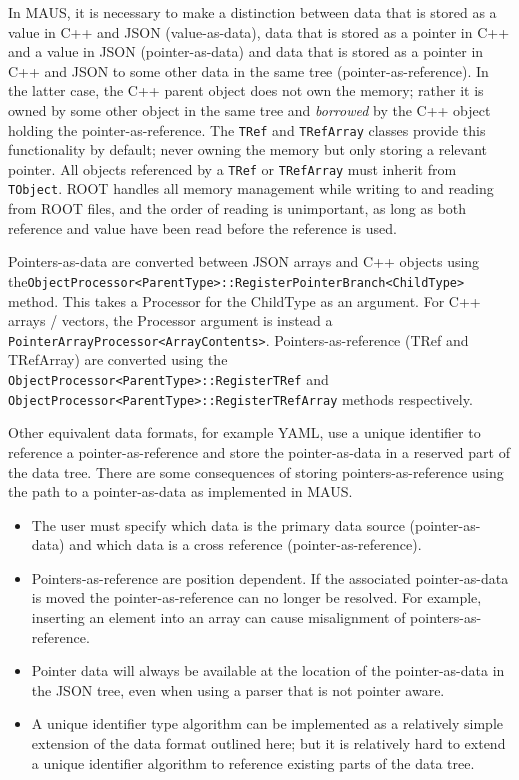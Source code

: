 In MAUS, it is necessary to make a distinction between data that is stored as a value in C++ and JSON (value-as-data), 
data that is stored as a pointer in C++ and a value in JSON (pointer-as-data) 
and data that is stored as a pointer in C++ and JSON to some other data in the same tree (pointer-as-reference). 
In the latter case, the C++ parent object does not own the memory; 
rather it is owned by some other object in the same tree and 
\emph{borrowed} by the C++ object holding the pointer-as-reference.
The \verb|TRef| and \verb|TRefArray| classes provide this functionality by default;
never owning the memory but only storing a relevant pointer.
All objects referenced by a \verb|TRef| or \verb|TRefArray|
must inherit from \verb|TObject|.
ROOT handles all memory management while writing to and reading from ROOT files,
and the order of reading is unimportant,
as long as both reference and value have been read before the reference is used.

Pointers-as-data are converted between JSON arrays and C++ objects
using the\linebreak\verb|ObjectProcessor<ParentType>::RegisterPointerBranch<ChildType>| method.
This takes a Processor for the ChildType as an argument.
For C++ arrays / vectors, the Processor argument is instead a 
\verb|PointerArrayProcessor<ArrayContents>|.
Pointers-as-reference (TRef and TRefArray) are converted using the
\verb|ObjectProcessor<ParentType>::RegisterTRef| and\linebreak
\verb|ObjectProcessor<ParentType>::RegisterTRefArray| methods respectively.

Other equivalent data formats, for example YAML, use a unique identifier to reference a pointer-as-reference and store the pointer-as-data in a reserved part of the data tree. There are some consequences of storing pointers-as-reference using the path to a pointer-as-data as implemented in MAUS.
\begin{itemize}
\item The user must specify which data is the primary data source (pointer-as-data) and which data is a cross reference (pointer-as-reference).
\item Pointers-as-reference are position dependent. If the associated pointer-as-data is moved the pointer-as-reference can no longer be resolved. For example, inserting an element into an array can cause misalignment of pointers-as-reference.
\item Pointer data will always be available at the location of the pointer-as-data in the JSON tree, even when using a parser that is not pointer aware.
\item A unique identifier type algorithm can be implemented as a relatively simple extension of the data format outlined here; but it is relatively hard to extend a unique identifier algorithm to reference existing parts of the data tree.
\end{itemize}

